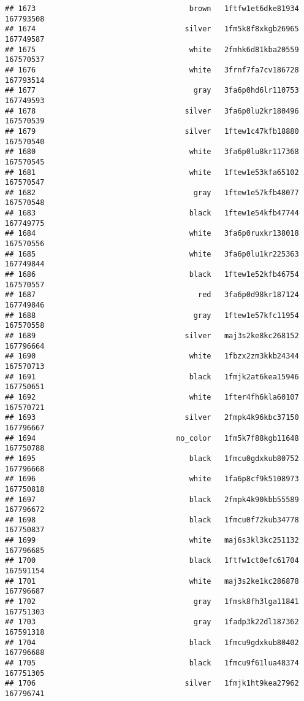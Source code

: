 \documentclass[
]{article}
\begin{document}
\begin{verbatim}
## 1673                                   brown   1ftfw1et6dke81934 167793508
## 1674                                  silver   1fm5k8f8xkgb26965 167749587
## 1675                                   white   2fmhk6d81kba20559 167570537
## 1676                                   white   3frnf7fa7cv186728 167793514
## 1677                                    gray   3fa6p0hd6lr110753 167749593
## 1678                                  silver   3fa6p0lu2kr180496 167570539
## 1679                                  silver   1ftew1c47kfb18880 167570540
## 1680                                   white   3fa6p0lu8kr117368 167570545
## 1681                                   white   1ftew1e53kfa65102 167570547
## 1682                                    gray   1ftew1e57kfb48077 167570548
## 1683                                   black   1ftew1e54kfb47744 167749775
## 1684                                   white   3fa6p0ruxkr138018 167570556
## 1685                                   white   3fa6p0lu1kr225363 167749844
## 1686                                   black   1ftew1e52kfb46754 167570557
## 1687                                     red   3fa6p0d98kr187124 167749846
## 1688                                    gray   1ftew1e57kfc11954 167570558
## 1689                                  silver   maj3s2ke8kc268152 167796664
## 1690                                   white   1fbzx2zm3kkb24344 167570713
## 1691                                   black   1fmjk2at6kea15946 167750651
## 1692                                   white   1fter4fh6kla60107 167570721
## 1693                                  silver   2fmpk4k96kbc37150 167796667
## 1694                                no_color   1fm5k7f88kgb11648 167750788
## 1695                                   black   1fmcu0gdxkub80752 167796668
## 1696                                   white   1fa6p8cf9k5108973 167750818
## 1697                                   black   2fmpk4k90kbb55589 167796672
## 1698                                   black   1fmcu0f72kub34778 167750837
## 1699                                   white   maj6s3kl3kc251132 167796685
## 1700                                   black   1ftfw1ct0efc61704 167591154
## 1701                                   white   maj3s2ke1kc286878 167796687
## 1702                                    gray   1fmsk8fh3lga11841 167751303
## 1703                                    gray   1fadp3k22dl187362 167591318
## 1704                                   black   1fmcu9gdxkub80402 167796688
## 1705                                   black   1fmcu9f61lua48374 167751305
## 1706                                  silver   1fmjk1ht9kea27962 167796741

\end{verbatim}
\end{document}
